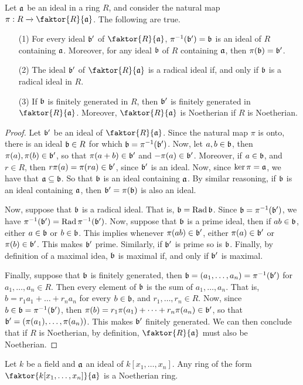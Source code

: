  \begin{theorem}\label{1.4.3}
     Let $\af$ be an ideal in a ring $R$, and consider the natural map $\pi:R
     \xrightarrow{} \faktor{R}{\af}$. The following are true.
     \begin{enumerate}
         \item[(1)] For every ideal $\bf'$ of $\faktor{R}{\af}$,
             $\inv{\pi}(\bf')=\bf$ is an ideal of $R$ containing $\af$.
             Moreover, for any ideal $\bf$ of $R$ containing $\af$, then
             $\pi(\bf)=\bf'$.

         \item[(2)] The ideal $\bf'$ of $\faktor{R}{\af}$ is a radical ideal if,
             and only if $\bf$ is a radical ideal in $R$.

         \item[(3)] If $\bf$ is finitely generated in $R$, then $\bf'$ is
             finitely generated in $\faktor{R}{\af}$. Moreover,
             $\faktor{R}{\af}$ is Noetherian if $R$ is Noetherian.
     \end{enumerate}
 \end{theorem}
 \begin{proof}
     Let $\bf'$ be an ideal of $\faktor{R}{\af}$. Since the natural map $\pi$ is
     onto, there is an ideal $\bf \in R$ for which $\bf=\inv{\pi}(\bf')$. Now,
     let $a,b \in \bf$, then $\pi(a),\pi(b) \in \bf'$, so that $\pi(a+b) \in
     \bf'$ and $-\pi(a) \in \bf'$. Moreover, if $a \in \bf$, and $r \in R$, then
     $r\pi(a)=\pi(ra) \in \bf'$, since $\bf'$ is an ideal. Now, since
     $\ker{\pi}=\af$, we have that $\af \subseteq \bf$. So that $\bf$ is an
     ideal containing $\af$. By similar reasoning, if $\bf$ is an ideal
     containing $\af$, then $\bf'=\pi(\bf)$ is also an ideal.

     Now, suppose that $\bf$ is a radical ideal. That is, $\bf=\Rad{\bf}$. Since
     $\bf=\inv{\pi}(\bf')$, we have $\inv{\pi}(\bf')=\Rad{\inv{\pi}(\bf')}$.
     Now, suppose that $\bf$ is a prime ideal, then if $ab \in \bf$, either $a
     \in \bf$ or $b \in \bf$. This implies whenever $\pi(ab) \in \bf'$, either
     $\pi(a) \in \bf'$ or $\pi(b) \in \bf'$. This makes $\bf'$ prime. Similarly,
     if $\bf'$ is prime so is $\bf$. Finally, by definition of a maximal idea,
     $\bf$ is maximal if, and only if $\bf'$ is maximal.

     Finally, suppose that $\bf$ is finitely generated, then $\bf=(a_1, \dots,
     a_n)=\inv{\pi}(\bf')$ for $a_1, \dots, a_n \in R$. Then every element of
     $\bf$ is the sum of $a_1, \dots, a_n$. That is, $b=r_1a_1+\dots+r_na_n$ for
     every $b \in \bf$, and $r_1, \dots, r_n \in R$. Now, since $b \in
     \bf=\inv{\pi}(\bf')$, then $\pi(b)=r_1\pi(a_1)+\dots+r_n\pi(a_n) \in \bf'$,
     so that $\bf'=(\pi(a_1), \dots, \pi(a_n))$. This makes $\bf'$ finitely
     generated. We can then conclude that if $R$ is Noetherian, by definition,
     $\faktor{R}{\af}$ must also be Noetherian.
 \end{proof}
 \begin{corollary}
     Let $k$ be a field and $\af$ an ideal of $k[x_1, \dots, x_n]$. Any ring of
     the form $\faktor{k[x_1, \dots, x_n]}{\af}$ is a Noetherian ring.
 \end{corollary}
